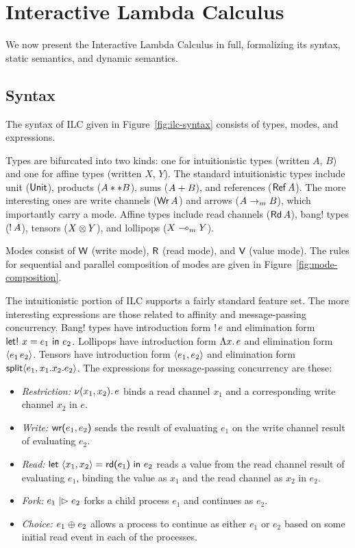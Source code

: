 




\section{Interactive Lambda Calculus}
\label{sec:ilc}

We now present the Interactive Lambda Calculus in full, formalizing its syntax,
static semantics, and dynamic semantics.

\subsection{Syntax}
\label{subsec:syntax}

The syntax of ILC given in Figure~\ref{fig:ilc-syntax} consists of types, modes,
and expressions.

Types are bifurcated into two kinds: one for intuitionistic types (written $A$,
$B$) and one for affine types (written $X$, $Y$). The standard intuitionistic
types include unit ($\text{\textsf{Unit}}$), products (${A} ** {B}$), sums
(${A} + {B}$), and references ($\text{\textsf{Ref}}\,A$). The more interesting ones are
write channels ($\text{\textsf{Wr}}\,A$) and arrows (${A}\rightarrow_{\footnotesize m}{B}$), which
importantly carry a mode. Affine types include read channels ($\text{\textsf{Rd}}\,A$),
bang! types (${!}\,{A}$), tensors (${X}\otimes{Y}$), and lollipops
(${X}\multimap_{\footnotesize m}{Y}$).

Modes consist of $\textsf{W}$ (write mode), $\textsf{R}$ (read mode), and $\textsf{V}$ (value
mode). The rules for sequential and parallel composition of modes are given in
Figure~\ref{fig:mode-composition}.

The intuitionistic portion of ILC supports a fairly standard feature set. The
more interesting expressions are those related to affinity and message-passing
concurrency. Bang! types have introduction form ${!}\,{e}$ and elimination form
$\text{\textsf{let!}}\ {x} = {e_1}\ \text{\textsf{in}}\ {e_2}$. Lollipops have introduction form $\Lambda{x}.\,{e}$ and
elimination form $\langle{e_1}\,{e_2}\rangle$. Tensors have introduction form
$\langle{e_1},{e_2}\rangle$ and elimination form $\text{\textsf{split}}\langle{e_1},{x_1}.{x_2}.{e_2}\rangle$. The expressions for message-passing concurrency are these:
\begin{itemize}[leftmargin=*]
  \item \emph{Restriction:} $\nu(x_1, x_2).\,e$ binds a read channel $x_1$ and
    a corresponding write channel $x_2$ in $e$.
  \item \emph{Write:} $\text{\textsf{wr}}\textsf{(}{e_1},{e_2}\textsf{)}$ sends the result of evaluating $e_1$ on
    the write channel result of evaluating $e_2$.
  \item \emph{Read:} $\text{\textsf{let}}\ {\langle{x_1},{x_2}\rangle} = {\text{\textsf{rd}}\textsf{(}{e_1}\textsf{)}}\ \text{\textsf{in}}\ {{e_2}}$ reads a value from the read
    channel result of evaluating $e_1$, binding the value as $x_1$ and the read
    channel as $x_2$ in $e_2$.
  \item \emph{Fork:} $e_1 \mathrel{|\rhd} e_2$ forks a child process $e_1$ and
    continues as $e_2$.
  \item \emph{Choice:} $e_1 \mathrel{\oplus} e_2$ allows a process to continue as
    either $e_1$ or $e_2$ based on some initial read event in each of the
    processes.
\end{itemize}

